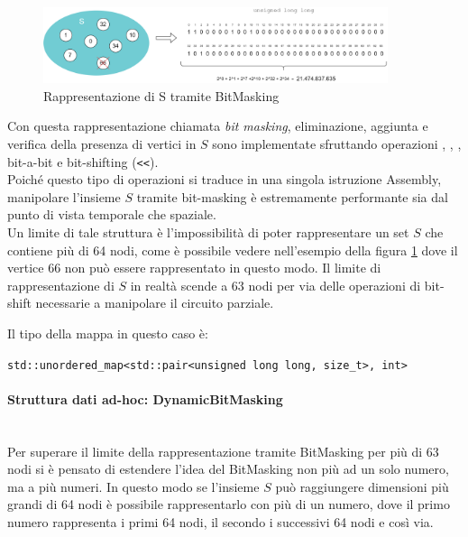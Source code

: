 \begin{figure}[h]
	\centering
	\includegraphics[width=0.9\textwidth]{./images/BitMasking Example.png}
	\caption{Rappresentazione di S tramite BitMasking}
	\label{fig:bitmasking-example}
\end{figure}

\noindent Con questa rappresentazione chiamata \textit{bit masking}, eliminazione, aggiunta e verifica della presenza di vertici in $S$ sono implementate sfruttando operazioni , , , bit-a-bit e bit-shifting (\texttt{<<}). \\

\noindent Poiché questo tipo di operazioni si traduce in una singola istruzione Assembly, manipolare l'insieme $S$ tramite bit-masking è estremamente performante sia dal punto di vista temporale che spaziale. \\

\noindent Un limite di tale struttura è l'impossibilità di poter rappresentare un set $S$ che contiene più di 64 nodi, come è possibile vedere nell'esempio della figura \ref{fig:bitmasking-example} dove il vertice 66 non può essere rappresentato in questo modo. Il limite di rappresentazione di $S$ in realtà scende a 63 nodi per via delle operazioni di bit-shift necessarie a manipolare il circuito parziale.

\noindent Il tipo della mappa in questo caso è:

\begin{center}
    \texttt{std::unordered_map<std::pair<unsigned long long, size_t>, int>}
\end{center}

\paragraph{Struttura dati ad-hoc: DynamicBitMasking}\mbox{} \\

\noindent Per superare il limite della rappresentazione tramite BitMasking per più di 63 nodi si è pensato di estendere l'idea del BitMasking non più ad un solo numero, ma a più numeri. In questo modo se l'insieme $S$ può raggiungere dimensioni più grandi di 64 nodi è possibile rappresentarlo con più di un numero, dove il primo numero rappresenta i primi 64 nodi, il secondo i successivi 64 nodi e così via. \\

